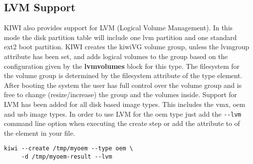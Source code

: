
\subsection{LVM Support}

KIWI also provides support for LVM (Logical Volume Management). In this
mode the disk partition table will include one lvm partition and one
standard ext2 boot partition. KIWI creates the kiwiVG volume group, unless
the lvmgroup attribute has been set, and adds logical volumes to the group
based on the configuration given by the \textbf{lvmvolumes} block
for this type. The filesystem for the volume group is determined by the
filesystem attribute of the type element. After booting the system the user
has full control over the volume group and is free to change
(resize/increase) the group and the volumes inside. Support for LVM has
been added for all disk based image types. This includes the vmx, oem and
usb image types. In order to use LVM for the oem type just add the 
\verb+--lvm+ command line option when executing the create step or add
the attribute  to of the  
element in your  file.

\begin{Command}{12cm}
\begin{verbatim}
kiwi --create /tmp/myoem --type oem \
     -d /tmp/myoem-result --lvm
\end{verbatim}
\end{Command}

